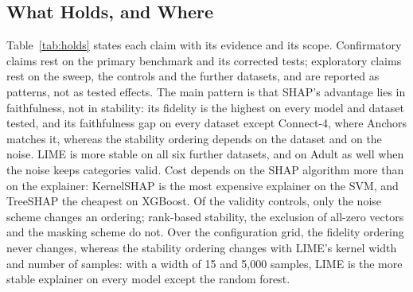\documentclass[11pt,a4paper]{article}
\begin{document}
\subsection{What Holds, and Where}

Table~\ref{tab:holds} states each claim with its evidence and its scope.
Confirmatory claims rest on the primary benchmark and its corrected tests;
exploratory claims rest on the sweep, the controls and the further
datasets, and are reported as patterns, not as tested effects. The main
pattern is that SHAP's advantage lies in faithfulness, not in stability:
its fidelity is the highest on every model and dataset tested, and its
faithfulness gap on every dataset except Connect-4, where Anchors matches it,
whereas the stability ordering depends on the dataset and on the noise. LIME
is more stable on all six further datasets, and on Adult as well when the
noise keeps categories valid. Cost depends on the SHAP algorithm more than on
the explainer: KernelSHAP is the most expensive explainer on the SVM, and
TreeSHAP the cheapest on XGBoost. Of the validity controls, only the noise
scheme changes an ordering; rank-based stability, the exclusion of all-zero
vectors and the masking scheme do not. Over the configuration grid, the fidelity ordering never changes,
whereas the stability ordering changes with LIME's kernel width and number of
samples: with a width of 15 and 5,000 samples, LIME is the more stable
explainer on every model except the random forest.
\end{document}
